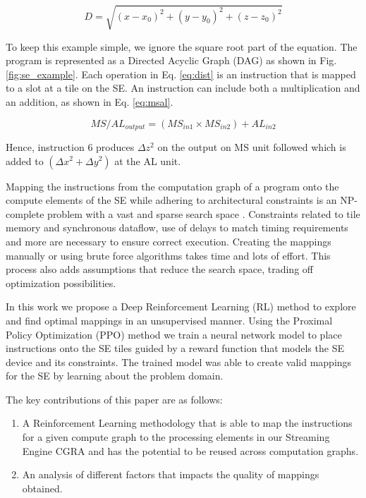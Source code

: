 \begin{equation}
    \label{eq:dist}
    D = \sqrt{(x - x_0)^2 +(y - y_0)^2 + (z - z_0)^2}
\end{equation}

To keep this example simple, we ignore the square root part of the equation.
The program is represented as a Directed Acyclic Graph (DAG) as shown in Fig. \ref{fig:se_example}.
Each operation in Eq. \ref{eq:dist} is an instruction that is mapped to a slot at a tile on the SE.
An instruction can include both a multiplication and an addition, as shown in Eq. \ref{eq:msal}.

\begin{equation}
    \label{eq:msal}
    MS/AL_{output} = (MS_{in1} \times MS_{in2}) + AL_{in2} 
\end{equation}

Hence, instruction 6 produces $\Delta z^2$ on the output on MS unit followed which is added to $(\Delta x^2 + \Delta y^2)$ at the AL unit.


Mapping the instructions from the computation graph of a program onto the compute elements of the SE while adhering to architectural constraints is an NP-complete problem with a vast and sparse search space \cite{10.1007/3-540-69346-7_30}. 
Constraints related to tile memory and synchronous dataflow, use of delays to match timing requirements and more are necessary to ensure correct execution. 
Creating the mappings manually or using brute force algorithms takes time and lots of effort. 
This process also adds assumptions that reduce the search space, trading off optimization possibilities.  

In this work we propose a Deep Reinforcement Learning (RL) method to explore and find optimal mappings in an unsupervised manner. 
Using the Proximal Policy Optimization (PPO) method we train a neural network model to place instructions onto the SE tiles guided by a reward function that models the SE device and its constraints. 
The trained model was able to create valid mappings for the SE by learning about the problem domain. 


The key contributions of this paper are as follows:
\begin{enumerate}
    \item A Reinforcement Learning methodology that is able to map the instructions for a given compute graph to the processing elements in our Streaming Engine CGRA and has the potential to be reused across computation graphs.
    \item An analysis of different factors that impacts the quality of mappings obtained.
\end{enumerate}

